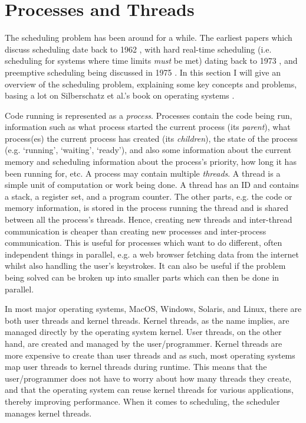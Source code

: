 \section{Processes and Threads}
The scheduling problem has been around for a while. The earliest papers which
discuss scheduling date back to 1962 \cite{corbato_experimental_1962}, with
hard real-time scheduling (i.e. scheduling for systems where time limits
\textit{must} be met) dating back to 1973 \cite{liu_scheduling_1973}, and
preemptive scheduling being discussed in 1975 \cite{kleinrock_computer_1976}. In
this section I will give an overview of the scheduling problem, explaining some
key concepts and problems, basing a lot on Silberschatz et al.'s book on
operating systems \cite{silberschatz_operating_2014}.

Code running is represented as a \textit{process}. Processes contain the code
being run, information such as what process started the current process (its
\textit{parent}), what process(es) the current process has created (its
\textit{children}), the state of the process (e.g. `running', `waiting',
`ready'), and also some information about the current memory and scheduling
information about the process's priority, how long it has been running for, etc.
A process may contain multiple \textit{threads}. A thread is a simple unit of
computation or work being done. A thread has an ID and contains a stack, a
register set, and a program counter. The other parts, e.g. the code or memory
information, is stored in the process running the thread and is shared between
all the process's threads. Hence, creating new threads and inter-thread
communication is cheaper than creating new processes and inter-process
communication. This is useful for processes which want to do different, often
independent things in parallel, e.g. a web browser fetching data from the
internet whilst also handling the user's keystrokes. It can also be useful if
the problem being solved can be broken up into smaller parts which can then be
done in parallel.

In most major operating systems, MacOS, Windows, Solaris, and Linux, there are
both user threads and kernel threads. Kernel threads, as the name implies, are
managed directly by the operating system kernel. User threads, on the other
hand, are created and managed by the user/programmer. Kernel threads are more
expensive to create than user threads and as such, most operating systems map
user threads to kernel threads during runtime. This means that the
user/programmer does not have to worry about how many threads they create, and
that the operating system can reuse kernel threads for various applications,
thereby improving performance. When it comes to scheduling, the scheduler
manages kernel threads.

